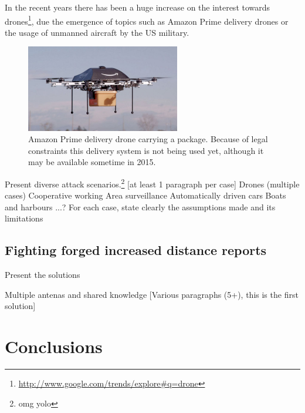 \documentclass{article}
\begin{document}
In the recent years there has been a huge increase on the interest towards drones\footnote{\url{http://www.google.com/trends/explore#q=drone}}, due the emergence of topics such as Amazon Prime delivery drones or the usage of unmanned aircraft by the US military.


\begin{figure}[h!]
  \centering
    \includegraphics[width=0.6\textwidth]{images/amazonprimedrone.png}
  \caption{Amazon Prime delivery drone carrying a package. Because of legal constraints this delivery system is not being used yet, although it may be available sometime in 2015.\protect\footnotemark[5]}
  \label{fig:attackexample1}
\end{figure}

\addtocounter{footnote}{1}

\index{\footnote[6]}




Present diverse attack scenarios.\footnote{omg yolo} [at least 1 paragraph per case]
   Drones (multiple cases)
     Cooperative working
     Area surveillance
   Automatically driven cars
   Boats and harbours
  ...?
For each case, state clearly the assumptions made and its limitations


\subsection{Fighting forged increased distance reports}

Present the solutions

Multiple antenas and shared knowledge [Various paragraphs (5+), this is the first solution]










\section{Conclusions}
\label{sec:conclusions}
\end{document}
